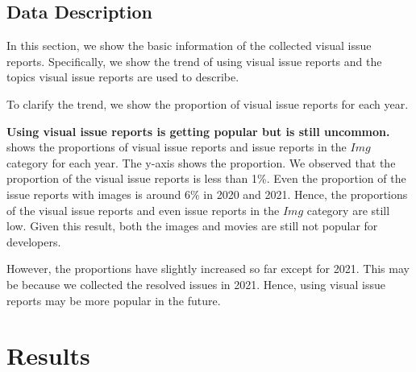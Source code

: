 







\subsection{Data Description}
In this section, we show the basic information of 
the collected visual issue reports.  
Specifically, we show the trend of using 
visual issue reports and 
the topics visual issue reports are used to describe.

To clarify the trend, we show the proportion of 
visual issue reports for each year. 

\textbf{Using visual issue reports is getting popular but is still uncommon.} 
 shows the proportions of 
visual issue reports and issue reports in the $Img$ category 
for each year. 
The y-axis shows the proportion. 
We observed that the proportion of the visual issue reports is 
less than 1\%. 
Even the proportion of the issue reports with images is around 6\% 
in 2020 and 2021. 
Hence, the proportions of the visual issue reports and 
even issue reports in the $Img$ category are still low. 
Given this result, both the images and movies are still not 
popular for developers. 

However, the proportions have slightly increased so far 
except for 2021. 
This may be because we collected the resolved issues 
in 2021. 
Hence, using visual issue reports may be more popular in the future. 

\section{Results}
\label{sec:results}

% 

